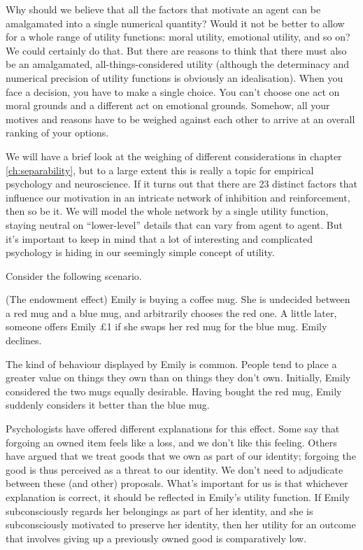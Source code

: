 Why should we believe that all the factors that motivate an agent can be
amalgamated into a single numerical quantity? Would it not be better to allow
for a whole range of utility functions: moral utility, emotional utility, and so
on? We could certainly do that. But there are reasons to think that there must
also be an amalgamated, all-things-considered utility (although the determinacy
and numerical precision of utility functions is obviously an idealisation). When
you face a decision, you have to make a single choice. You can't choose one act
on moral grounds and a different act on emotional grounds. Somehow, all your
motives and reasons have to be weighed against each other to arrive at an
overall ranking of your options.

We will have a brief look at the weighing of different considerations in chapter
\ref{ch:separability}, but to a large extent this is really a topic for
empirical psychology and neuroscience. If it turns out that there are 23
distinct factors that influence our motivation in an intricate network of
inhibition and reinforcement, then so be it. We will model the whole network by
a single utility function, staying neutral on ``lower-level'' details that can
vary from agent to agent. But it's important to keep in mind that a lot of
interesting and complicated psychology is hiding in our seemingly simple concept
of utility.

Consider the following scenario.
%
\begin{example}(The endowment effect)
  Emily is buying a coffee mug. She is undecided between a red mug and a blue
  mug, and arbitrarily chooses the red one. A little later, someone
  offers Emily £1 if she swaps her red mug for the blue mug. Emily declines.
\end{example}

The kind of behaviour displayed by Emily is common. People tend to place a
greater value on things they own than on things they don't own. Initially, Emily
considered the two mugs equally desirable. Having bought the red mug, Emily
suddenly considers it better than the blue mug.

Psychologists have offered different explanations for this effect. Some say that
forgoing an owned item feels like a loss, and we don't like this feeling. Others
have argued that we treat goods that we own as part of our identity; forgoing
the good is thus perceived as a threat to our identity. We don't need to
adjudicate between these (and other) proposals. What's important for us is that
whichever explanation is correct, it should be reflected in Emily's utility
function. If Emily subconsciously regards her belongings as part of her
identity, and she is subconsciously motivated to preserve her identity, then her
utility for an outcome that involves giving up a previously owned good is
comparatively low.


